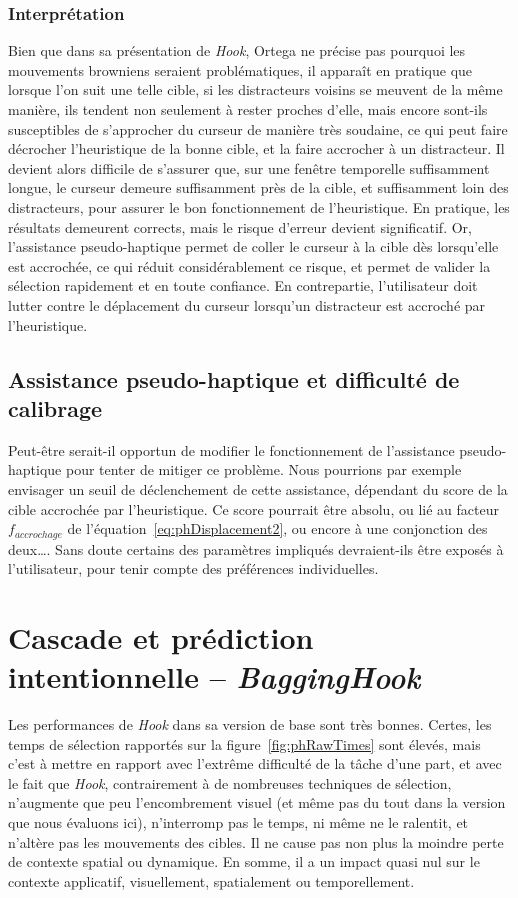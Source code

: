 	\subsubsection{Interprétation}
	Bien que dans sa présentation de \emph{Hook}, Ortega ne précise pas pourquoi les mouvements browniens seraient problématiques, il apparaît en pratique que lorsque l'on suit une telle cible, si les distracteurs voisins se meuvent de la même manière, ils tendent non seulement à rester proches d'elle, mais encore sont-ils susceptibles de s'approcher du curseur de manière très soudaine, ce qui peut faire décrocher l'heuristique de la bonne cible, et la faire accrocher à un distracteur. Il devient alors difficile de s'assurer que, sur une fenêtre temporelle suffisamment longue, le curseur demeure suffisamment près de la cible, et suffisamment loin des distracteurs, pour assurer le bon fonctionnement de l'heuristique. En pratique, les résultats demeurent corrects, mais le risque d'erreur devient significatif. Or, l'assistance pseudo-haptique permet de \og coller \fg{} le curseur à la cible dès lorsqu'elle est accrochée, ce qui réduit considérablement ce risque, et permet de valider la sélection rapidement et en toute confiance. En contrepartie, l'utilisateur doit lutter contre le déplacement du curseur lorsqu'un distracteur est accroché par l'heuristique.
	
	\subsection{Assistance pseudo-haptique et difficulté de calibrage}
	Peut-être serait-il opportun de modifier le fonctionnement de l'assistance pseudo-haptique pour tenter de mitiger ce problème. Nous pourrions par exemple envisager un seuil de déclenchement de cette assistance, dépendant du score de la cible accrochée par l'heuristique. Ce score pourrait être absolu, ou lié au facteur $f_{accrochage}$ de l'équation~\ref{eq:phDisplacement2}, ou encore à une conjonction des deux\ldots{}. Sans doute certains des paramètres impliqués devraient-ils être exposés à l'utilisateur, pour tenir compte des préférences individuelles.

	
	\section{Cascade et prédiction intentionnelle -- \emph{BaggingHook}}
	Les performances de \emph{Hook} dans sa version de base sont très bonnes. Certes, les temps de sélection rapportés sur la figure~\ref{fig:phRawTimes} sont élevés, mais c'est à mettre en rapport avec l'extrême difficulté de la tâche d'une part, et avec le fait que \emph{Hook}, contrairement à de nombreuses techniques de sélection, n'augmente que peu l'encombrement visuel (et même pas du tout dans la version que nous évaluons ici), n'interromp pas le temps, ni même ne le ralentit, et n'altère pas les mouvements des cibles. Il ne cause pas non plus la moindre perte de contexte spatial ou dynamique. En somme, il a un impact quasi nul sur le contexte applicatif, visuellement, spatialement ou temporellement.
	
